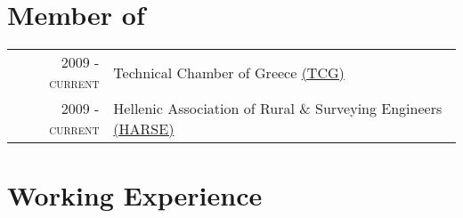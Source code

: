 \documentclass[a4paper,10pt]{article} %
\begin{document}
\medskip

\section{Member of}
\begin{longtable}{rp{13cm}}
\textsc{2009 - current} & Technical Chamber of Greece \href{http://web.tee.gr/}{(TCG)}\\
\textsc{2009 - current} & Hellenic Association of Rural \& Surveying Engineers \href{http://www.psdatm.gr/}{(HARSE)}\\
\end{longtable}
\medskip


\section{Working Experience}
\end{document}
